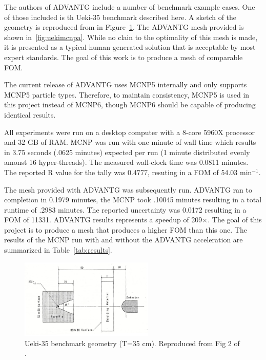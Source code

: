\documentclass[conference]{IEEEtran}
\begin{document}
The authors of ADVANTG include a number of benchmark example cases. One of those included is th Ueki-35 benchmark described here. A sketch of the geometry is reproduced from \cite{ref:Ueki1992} in Figure~\ref{fig:uekifig2}. The ADVANTG mesh provided is shown in~\ref{fig:uekimcnpa}. While no clain to the optimality of this mesh is made, it is presented as a typical human generated solution that is acceptable by most expert standards. The goal of this work is to produce a mesh of comparable FOM.

The current release of ADVANTG uses MCNP5 internally and only supports MCNP5 particle types. Therefore, to maintain consistency, MCNP5 is used in this project instead of MCNP6, though MCNP6 should be capable of producing identical results.

All experiments were run on a desktop computer with a 8-core 5960X processor and 32 GB of RAM. MCNP was run with one minute of wall time which results in 3.75 seconds (.0625 minutes) expected per run (1 minute distributed evenly amonst 16 hyper-threads). The measured wall-clock time was 0.0811 minutes. The reported R value for the tally was 0.4777, resuting in a FOM of 54.03 min$^{-1}$.

The mesh provided with ADVANTG was subsequently run. ADVANTG ran to completion in 0.1979 minutes, the MCNP took .10045 minutes resulting in a total runtime of .2983 minutes. The reported uncertainty was 0.0172 resulting in a FOM of 11331. ADVANTG results represents a speedup of 209$\times$. The goal of this project is to produce a mesh that produces a higher FOM than this one. The results of the MCNP run with and without the ADVANTG acceleration are summarized in Table~\ref{tab:results}.

\begin{figure}[!t]
\centering
\includegraphics[width=2.5in]{uekifig2}
\caption{Ueki-35 benchmark geometry (T=35 cm). Reproduced from Fig 2 of \cite{ref:Ueki1992}.}
\label{fig:uekifig2}
\end{figure}
\end{document}
